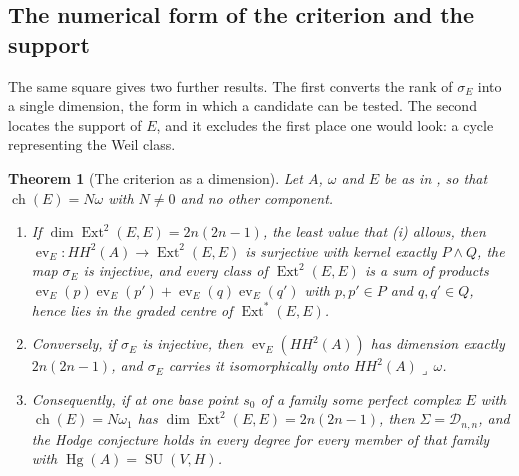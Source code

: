 \documentclass[11pt,reqno]{amsart}
\theoremstyle{plain}
\newtheorem{theorem}{Theorem}[section]
\theoremstyle{definition}
\theoremstyle{remark}
\newcommand{\cD}{\mathcal{D}}
\DeclareMathOperator{\ch}{ch}
\DeclareMathOperator{\Ext}{Ext}
\DeclareMathOperator{\Hg}{Hg}
\DeclareMathOperator{\SU}{SU}
\begin{document}
\subsection{The numerical form of the criterion and the support}

The same square gives two further results. The first converts the rank of
$\sigma_{E}$ into a single dimension, the form in which a candidate can be
tested. The second locates the support of $E$, and it excludes the first
place one would look: a cycle representing the Weil class.

\begin{theorem}[The criterion as a dimension]\label{thm:p2numerical}
Let $A$, $\omega$ and $E$ be as in , so that
$\ch(E)=N\omega$ with $N\ne0$ and no other component.
\begin{enumerate}[label=\textup{(\roman*)},leftmargin=2.6em,itemsep=2pt]
\item If $\dim\Ext^{2}(E,E)=2n(2n-1)$, the least value that
  (i) allows, then $\operatorname{ev}_{E}\colon
  HH^{2}(A)\to\Ext^{2}(E,E)$ is surjective with kernel exactly $P\wedge Q$,
  the map $\sigma_{E}$ is injective, and every class of $\Ext^{2}(E,E)$ is a
  sum of products $\operatorname{ev}_{E}(p)\operatorname{ev}_{E}(p')
  +\operatorname{ev}_{E}(q)\operatorname{ev}_{E}(q')$ with $p,p'\in P$ and
  $q,q'\in Q$, hence lies in the graded centre of $\Ext^{*}(E,E)$.
\item Conversely, if $\sigma_{E}$ is injective, then
  $\operatorname{ev}_{E}(HH^{2}(A))$ has dimension exactly $2n(2n-1)$, and
  $\sigma_{E}$ carries it isomorphically onto $HH^{2}(A)\lrcorner\,\omega$.
\item Consequently, if at one base point $s_{0}$ of a family some perfect
  complex $E$ with $\ch(E)=N\omega_{1}$ has $\dim\Ext^{2}(E,E)=2n(2n-1)$,
  then $\Sigma=\cD_{n,n}$, and the Hodge conjecture holds in every degree for
  every member of that family with $\Hg(A)=\SU(V,H)$.
\end{enumerate}
\end{theorem}
\end{document}
